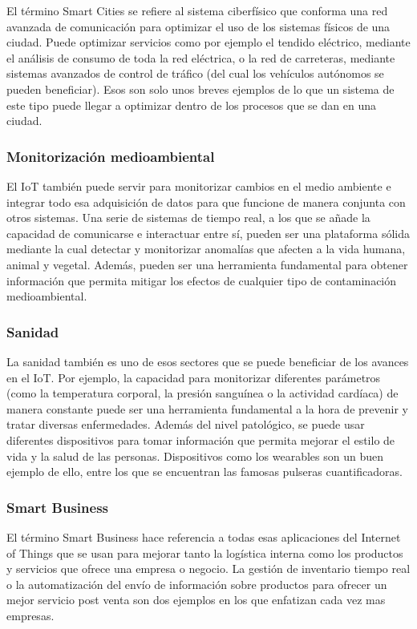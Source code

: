El término Smart Cities se refiere al sistema ciberfísico que conforma una red avanzada de comunicación para optimizar el uso de los sistemas físicos de una ciudad. Puede optimizar servicios como por ejemplo el tendido eléctrico, mediante el análisis de consumo de toda la red eléctrica, o la red de carreteras, mediante sistemas avanzados de control de tráfico (del cual los vehículos autónomos se pueden beneficiar). Esos son solo unos breves ejemplos de lo que un sistema de este tipo puede llegar a optimizar dentro de los procesos que se dan en una ciudad.
	
\subsubsection{Monitorización medioambiental}

El IoT también puede servir para monitorizar cambios en el medio ambiente e integrar todo esa adquisición de datos para que funcione de manera conjunta con otros sistemas. Una serie de sistemas de tiempo real, a los que se añade la capacidad de comunicarse e interactuar entre sí, pueden ser una plataforma sólida mediante la cual detectar y monitorizar anomalías que afecten a la vida humana, animal y vegetal. Además, pueden ser una herramienta fundamental para obtener información que permita mitigar los efectos de cualquier tipo de contaminación medioambiental.
	
\subsubsection{Sanidad}

La sanidad también es uno de esos sectores que se puede beneficiar de los avances en el IoT. Por ejemplo, la capacidad para monitorizar diferentes parámetros (como la temperatura corporal, la presión sanguínea o la actividad cardíaca) de manera constante puede ser una herramienta fundamental a la hora de prevenir y tratar diversas enfermedades. Además del nivel patológico, se puede usar  diferentes dispositivos para tomar información que permita mejorar el estilo de vida y la salud de las personas. Dispositivos como los wearables son un buen ejemplo de ello, entre los que se encuentran las famosas pulseras cuantificadoras. 
	
\subsubsection{Smart Business}

El término Smart Business hace referencia a todas esas aplicaciones del Internet of Things que se usan para mejorar tanto la logística interna como los productos y servicios que ofrece una empresa o negocio. La gestión de inventario tiempo real o la automatización del envío de información sobre productos para ofrecer un mejor servicio post venta son dos ejemplos en los que enfatizan cada vez mas empresas.
	
